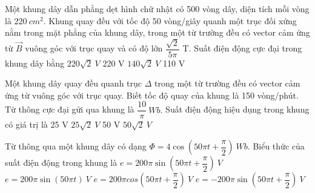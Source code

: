 \begin{vidu} %
	Một khung dây dẫn phẳng dẹt hình chữ nhật có 500 vòng dây, diện tích mỗi vòng là $220\ cm^2$. Khung quay đều với tốc độ 50 vòng/giây quanh một trục đối xứng nằm trong mặt phẳng của khung dây, trong một từ trường đều có vector cảm ứng từ $\vec{B}$ vuông góc với trục quay và có độ lớn $\dfrac{\sqrt{2}}{5\pi }$ T. Suất điện động cực đại trong khung dây bằng
	\choice
	{\True $220\sqrt{2}\ V$}
	{220 V}
	{$140\sqrt{2}\ V$}
	{110 V}
\end{vidu}
\begin{vidu}%
	Một khung dây quay đều quanh trục $\Delta$ trong một từ trường đều có vector cảm ứng từ vuông góc với trục quay. Biết tốc độ quay của khung là 150 vòng/phút. Từ thông cực đại gửi qua khung là $ \dfrac{10}{\pi}\ Wb.$ Suất điện động hiệu dụng trong khung có giá trị là
	\choice
	{25 V}
	{\True $25\sqrt{2}\ V$}
	{50 V}
	{$50\sqrt{2}\ V$}
\end{vidu}
\begin{vidu} %
	Từ thông qua một khung dây có dạng $\Phi =4\cos \left(50\pi t+\dfrac{\pi}{2}\right)\ Wb$. Biểu thức của suất điện động trong khung là
	\choice
	{\True $e=200\pi \sin \left(50\pi t+\dfrac{\pi}{2}\right)\ V$}
	{$e=200\pi \sin \left(50\pi t\right)\ V$}
	{$e=200\pi cos\left(50\pi t+\dfrac{\pi}{2}\right)\ V$}
	{$e=-200\pi \sin \left(50\pi t+\dfrac{\pi}{2}\right)\ V$}
\end{vidu}
